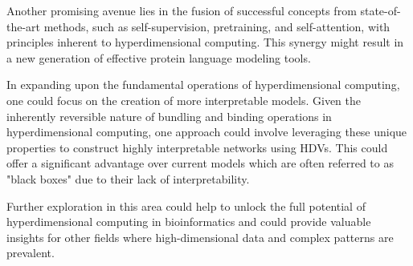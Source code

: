 Another promising avenue lies in the fusion of successful concepts from state-of-the-art methods, such as self-supervision, pretraining, and self-attention, with principles inherent to hyperdimensional computing. This synergy might result in a new generation of effective protein language modeling tools.

In expanding upon the fundamental operations of hyperdimensional computing, one could focus on the creation of more interpretable models. Given the inherently reversible nature of bundling and binding operations in hyperdimensional computing, one approach could involve leveraging these unique properties to construct highly interpretable networks using HDVs. This could offer a significant advantage over current models which are often referred to as "black boxes" due to their lack of interpretability.

Further exploration in this area could help to unlock the full potential of hyperdimensional computing in bioinformatics and could provide valuable insights for other fields where high-dimensional data and complex patterns are prevalent.